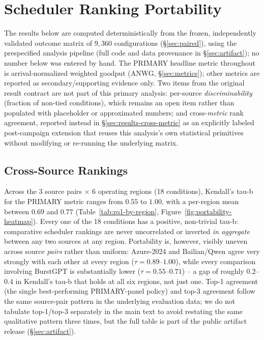 \section{Scheduler Ranking Portability}
\label{sec:results}

The results below are computed deterministically from the frozen,
independently validated outcome matrix of $9{,}360$ configurations
(\S\ref{sec:paired}), using the prespecified analysis pipeline (full code
and data provenance in \S\ref{sec:artifact}); no number below was entered
by hand. The PRIMARY headline metric throughout is arrival-normalized
weighted goodput (ANWG, \S\ref{sec:metrics}); other metrics are reported
as secondary/supporting evidence only. Two items from the original result
contract are not part of this primary analysis: per-source
\emph{discriminability} (fraction of non-tied conditions), which remains
an open item rather than populated with placeholder or approximated
numbers; and cross-\emph{metric} rank agreement, reported instead in
\S\ref{sec:results-cross-metric} as an explicitly labeled post-campaign
extension that reuses this analysis's own statistical primitives without
modifying or re-running the underlying matrix.

\subsection{Cross-Source Rankings}
\label{sec:cross-source-rankings}

Across the 3 source pairs $\times$ 6 operating regions (18 conditions),
Kendall's tau-b for the PRIMARY metric ranges from $0.55$ to $1.00$, with a
per-region mean between $0.69$ and $0.77$ (Table~\ref{tab:rq1-by-region},
Figure~\ref{fig:portability-heatmap}). Every one of the 18 conditions has a
positive, non-trivial tau-b: comparative scheduler rankings are never
uncorrelated or inverted \emph{in aggregate} between any two sources at any
region. Portability is, however, visibly uneven across source \emph{pairs}
rather than uniform: Azure-2024 and Bailian/Qwen agree very strongly with
each other at every region ($\tau = 0.89$--$1.00$), while every
comparison involving BurstGPT is substantially lower ($\tau =
0.55$--$0.71$) -- a gap of roughly $0.2$--$0.4$ in Kendall's tau-b that
holds at all six regions, not just one. Top-1 agreement (the single
best-performing PRIMARY-panel policy) and top-3 agreement follow the same
source-pair pattern in the underlying evaluation data; we do not
tabulate top-1/top-3 separately in the main text to avoid restating the
same qualitative pattern three times, but the full table is part of the
public artifact release (\S\ref{sec:artifact}).

